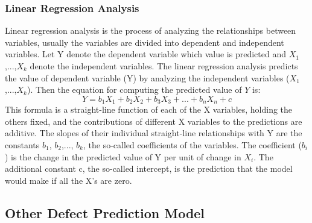 \documentclass[12pt]{report}
\begin{document}
\subsubsection{Linear Regression Analysis}
Linear regression analysis is the process of analyzing the relationships between variables, usually the variables are divided into dependent and independent variables. Let Y denote the dependent variable which value is predicted and $X_{1}$,...,$X_{k}$ denote the independent variables. The linear regression analysis predicts the value of dependent variable (Y) by analyzing the independent variables ($X_{1}$,...,$X_{k}$). Then the equation for computing the predicted value of $Y$ is:
\begin{equation}
\label{eq:linear_regression_analysis}
 Y=b_{1}X_{1}+b_{2}X_{2}+b_{3}X_{3}+...+b_{n}X_{n}+c
\end{equation}
This formula is a straight-line function of each of the X variables, holding the others fixed, and the contributions of different X variables to the predictions are additive. The slopes of their individual straight-line relationships with Y are the constants $b_{1}$, $b_{2}$,..., $b_{k}$, the so-called coefficients of the variables. The coefficient ($b_{i}$) is the change in the predicted value of Y per unit of change in $X_{i}$. The additional constant c, the so-called intercept, is the prediction that the model would make if all the X’s are zero. 

%
\subsection{Other Defect Prediction Model}
\end{document}
